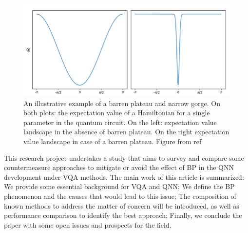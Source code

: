 \begin{figure}[h]
    \centering
    \includegraphics[width=\textwidth]{src/Appendices/example-of-a-barren-plateau.png}
    \caption{
        An illustrative example of a barren plateau and narrow gorge.
        On both plots: the expectation value of a Hamiltonian for a single parameter in the quantum circuit.
        On the left: expectation value landscape in the absence of barren plateau. 
        On the right expectation value landscape in case of a barren plateau.
        Figure from ref \cite{tillyVariationalQuantumEigensolver2021}
    }
    \label{fig: Barren Plateau Example}
\end{figure}



This research project undertakes a study that aims to survey and compare some countermeasure approaches to mitigate or avoid the effect of BP in the QNN development under VQA methods. 
The main work of this article is summarized: 
We provide some essential background for VQA and QNN;
We define the BP phenomenon and the causes that would lead to this issue; 
The composition of known methods to address the matter of concern will be introduced, as well as performance comparison to identify the best approach; 
Finally, we conclude the paper with some open issues and prospects for the field.
